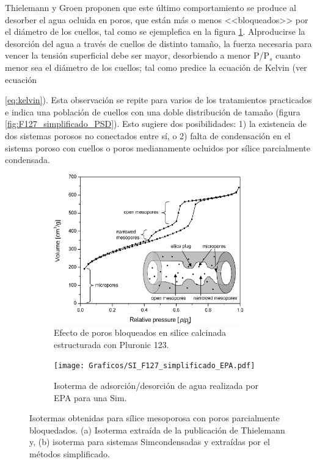 			Thielemann \cite{Thielemann2011} y Groen\cite{Groen2003} proponen que este último comportamiento se produce al desorber el agua ocluida en poros, que están más o menos <<bloqueados>> por el diámetro de los cuellos, tal como se ejemplefica en la figura \ref{fig:thielemann}. Al\space producirse la desorción del agua a través de cuellos de distinto tamaño, la fuerza  necesaria para vencer la tensión superficial debe ser mayor, desorbiendo a menor P/P$_s$ cuanto menor sea el diámetro de los cuellos; tal como predice la ecuación de Kelvin (ver ecuación {\ref{eq:kelvin}). Esta observación se repite para varios de los tratamientos practicados e indica una población de cuellos con una doble distribución de tamaño (figura \ref{fig:F127_simplificado_PSD}). Esto sugiere dos posibilidades: 1) la existencia de dos sistemas porosos no conectados entre sí, o 2) falta de condensación en el sistema poroso con cuellos o poros medianamente ocluidos por sílice parcialmente condensada.

			\begin{figure}[th]
		 	   	    \begin{subfigure}[t]{0.49\textwidth}
			       	\includegraphics[width=0.90\textwidth]{Graficos/Doble-distr.png}
			       	\caption{Efecto de poros bloqueados en silice calcinada estructurada con Pluronic 123.}
			       	\label{fig:thielemann}
			   		\end{subfigure}
			   		\begin{subfigure}[t]{0.49\textwidth}
			   	    \texttt{[image: Graficos/SI\_F127\_simplificado\_EPA.pdf]}
			   	    \caption{Isoterma de adsorción/desorción de agua realizada por EPA para una Sim\pdmF.}
			   		\end{subfigure}
					 \caption{Isotermas obtenidas para sílice mesoporosa con poros parcialmente bloquedados. (a) Isoterma extraída de la publicación de Thielemann\cite{Thielemann2011} y, (b) isoterma para sistemas Sim\pdmF\space condensadas y extraídas por el métodos simplificado.}
					 \label{fig:F127_simplificado_EPA_2}	
				     \end{figure}

}
